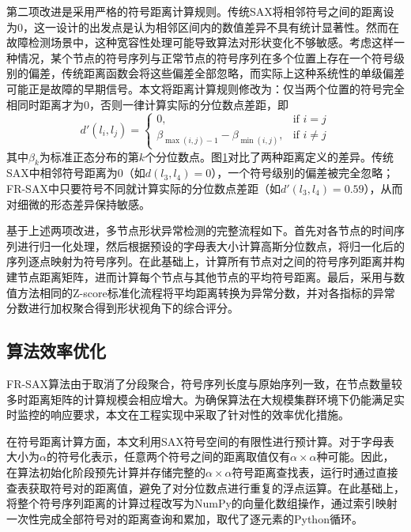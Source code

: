 第二项改进是采用严格的符号距离计算规则。传统SAX将相邻符号之间的距离设为0，这一设计的出发点是认为相邻区间内的数值差异不具有统计显著性。然而在故障检测场景中，这种宽容性处理可能导致算法对形状变化不够敏感。考虑这样一种情况，某个节点的符号序列与正常节点的符号序列在多个位置上存在一个符号级别的偏差，传统距离函数会将这些偏差全部忽略，而实际上这种系统性的单级偏差可能正是故障的早期信号。本文将距离计算规则修改为：仅当两个位置的符号完全相同时距离才为0，否则一律计算实际的分位数点差距，即
\begin{equation}
    d'(l_i, l_j) = \begin{cases}
        0, & \text{if } i = j \\
        \beta_{\max(i,j)-1} - \beta_{\min(i,j)}, & \text{if } i \neq j
    \end{cases}
\end{equation}
其中$\beta_k$为标准正态分布的第$k$个分位数点。图\ref{fig:sax_distance}对比了两种距离定义的差异。传统SAX中相邻符号距离为0（如$d(l_3, l_4)=0$），一个符号级别的偏差被完全忽略；FR-SAX中只要符号不同就计算实际的分位数点差距（如$d'(l_3, l_4)=0.59$），从而对细微的形态差异保持敏感。

\begin{figure}[htbp]
    \centering
    \resizebox{\textwidth}{!}{}
    \label{fig:sax_distance}
\end{figure}

基于上述两项改进，多节点形状异常检测的完整流程如下。首先对各节点的时间序列进行归一化处理，然后根据预设的字母表大小计算高斯分位数点，将归一化后的序列逐点映射为符号序列。在此基础上，计算所有节点对之间的符号序列距离并构建节点距离矩阵，进而计算每个节点与其他节点的平均符号距离。最后，采用与数值方法相同的Z-score标准化流程将平均距离转换为异常分数，并对各指标的异常分数进行加权聚合得到形状视角下的综合评分。

\subsection{算法效率优化}

FR-SAX算法由于取消了分段聚合，符号序列长度与原始序列一致，在节点数量较多时距离矩阵的计算规模会相应增大。为确保算法在大规模集群环境下仍能满足实时监控的响应要求，本文在工程实现中采取了针对性的效率优化措施。

在符号距离计算方面，本文利用SAX符号空间的有限性进行预计算。对于字母表大小为$\alpha$的符号化表示，任意两个符号之间的距离取值仅有$\alpha \times \alpha$种可能。因此，在算法初始化阶段预先计算并存储完整的$\alpha \times \alpha$符号距离查找表，运行时通过直接查表获取符号对的距离值，避免了对分位数点进行重复的浮点运算。在此基础上，将整个符号序列距离的计算过程改写为NumPy的向量化数组操作，通过索引映射一次性完成全部符号对的距离查询和累加，取代了逐元素的Python循环。

